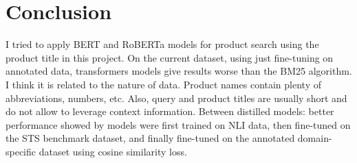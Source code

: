 \documentclass{article}
\begin{document}
\section{Conclusion}
I tried to apply BERT and RoBERTa models for product search using the product title in this project. On the current dataset, using just fine-tuning on annotated data, transformers models give results worse than the BM25 algorithm. I think it is related to the nature of data. Product names contain plenty of abbreviations, numbers, etc. Also, query and product titles are usually short and do not allow to leverage context information. 
Between distilled models: better performance showed by models were first trained on NLI data, then fine-tuned on the STS benchmark dataset,  and finally fine-tuned on the annotated domain-specific dataset using cosine similarity loss. 



\end{document}
